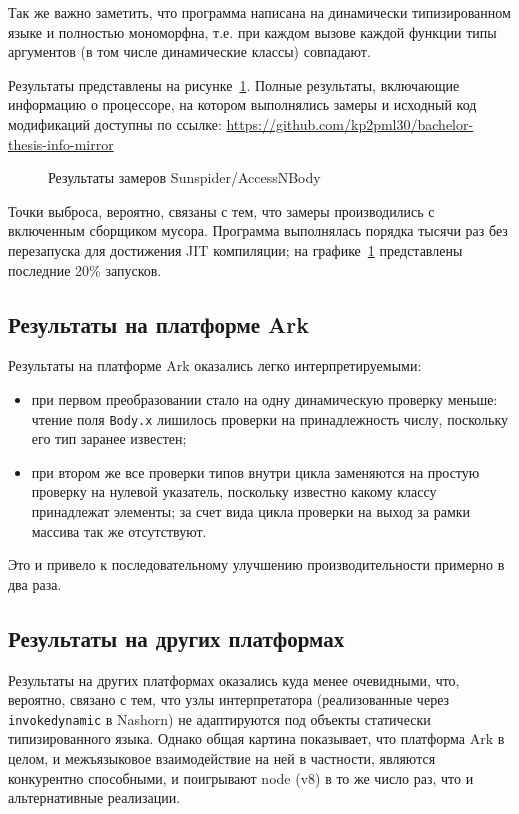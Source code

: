 \documentclass[times
,titlepage
]{itmo-student-thesis}
\begin{document}
Так же важно заметить, что программа написана на динамически типизированном языке и полностью мономорфна, т.е. при каждом вызове каждой функции типы аргументов (в том числе динамические классы) совпадают.

Результаты представлены на рисунке~\ref{fig:accessnbodyres}. Полные результаты, включающие информацию о процессоре, на котором выполнялись замеры и исходный код модификаций доступны по ссылке: \url{https://github.com/kp2pml30/bachelor-thesis-info-mirror}
\begin{figure}[!h]
	\caption{Результаты замеров Sunspider/AccessNBody}\label{fig:accessnbodyres}
	\resizebox{\textwidth}{!}{}
\end{figure}

Точки выброса, вероятно, связаны с тем, что замеры производились с включенным сборщиком мусора. Программа выполнялась порядка тысячи раз без перезапуска для достижения JIT компиляции; на графике~\ref{fig:accessnbodyres} представлены последние 20\% запусков.

\subsection{Результаты на платформе Ark}
Результаты на платформе Ark оказались легко интерпретируемыми:
\begin{itemize}
\item при первом преобразовании стало на одну динамическую проверку меньше: чтение поля \texttt{Body.x} лишилось проверки на принадлежность числу, поскольку его тип заранее известен;
\item при втором же все проверки типов внутри цикла заменяются на простую проверку на нулевой указатель, поскольку известно какому классу принадлежат элементы; за счет вида цикла проверки на выход за рамки массива так же отсутствуют.
\end{itemize}

Это и привело к последовательному улучшению производительности примерно в два раза.

\subsection{Результаты на других платформах}
Результаты на других платформах оказались куда менее очевидными, что, вероятно, связано с тем, что узлы интерпретатора (реализованные через \texttt{invokedynamic} в Nashorn) не адаптируются под объекты статически типизированного языка. Однако общая картина показывает, что платформа Ark в целом, и межъязыковое взаимодействие на ней в частности, являются конкурентно способными, и поигрывают node (v8) в то же число раз, что и альтернативные реализации.
\end{document}
